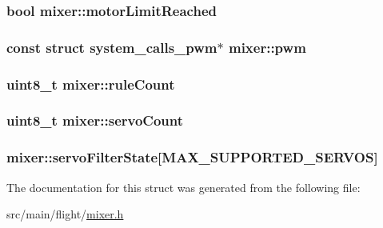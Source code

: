 \hypertarget{structmixer_a83c6e89ff4cb6f7d3a90f02f1e93e95a}{
\subsubsection[{motor\+Limit\+Reached}]{\setlength{\rightskip}{0pt plus 5cm}bool mixer\+::motor\+Limit\+Reached}}\label{structmixer_a83c6e89ff4cb6f7d3a90f02f1e93e95a}
\hypertarget{structmixer_a4078c7c29ab6137cb7a37e5e71b4080b}{
\subsubsection[{pwm}]{\setlength{\rightskip}{0pt plus 5cm}const struct {\bf system\+\_\+calls\+\_\+pwm}$\ast$ mixer\+::pwm}}\label{structmixer_a4078c7c29ab6137cb7a37e5e71b4080b}
\hypertarget{structmixer_abb2cbecb797db369a394819c2a43f08f}{
\subsubsection[{rule\+Count}]{\setlength{\rightskip}{0pt plus 5cm}uint8\+\_\+t mixer\+::rule\+Count}}\label{structmixer_abb2cbecb797db369a394819c2a43f08f}
\hypertarget{structmixer_a1e137d87ca55446d811ad03975e36075}{
\subsubsection[{servo\+Count}]{\setlength{\rightskip}{0pt plus 5cm}uint8\+\_\+t mixer\+::servo\+Count}}\label{structmixer_a1e137d87ca55446d811ad03975e36075}
\hypertarget{structmixer_a6e8393f54c0783445ab118308e887615}{
\subsubsection[{servo\+Filter\+State}]{ mixer\+::servo\+Filter\+State\mbox{[}{\bf M\+A\+X\+\_\+\+S\+U\+P\+P\+O\+R\+T\+E\+D\+\_\+\+S\+E\+R\+V\+O\+S}\mbox{]}}}\label{structmixer_a6e8393f54c0783445ab118308e887615}


The documentation for this struct was generated from the following file\+:\begin{DoxyCompactItemize}
\item 
src/main/flight/\hyperlink{flight_2mixer_8h}{mixer.\+h}\end{DoxyCompactItemize}
